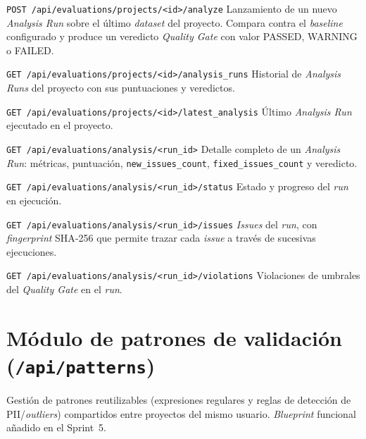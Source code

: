 \begin{definitionlist}
  \item[\texttt{POST /api/evaluations/projects/<id>/analyze}]  Lanzamiento
    de un nuevo \emph{Analysis Run} sobre el último \emph{dataset} del
    proyecto.  Compara contra el \emph{baseline} configurado y produce un
    veredicto \emph{Quality Gate} con valor PASSED, WARNING o FAILED.

  \item[\texttt{GET /api/evaluations/projects/<id>/analysis\_runs}]
    Historial de \emph{Analysis Runs} del proyecto con sus puntuaciones y
    veredictos.

  \item[\texttt{GET /api/evaluations/projects/<id>/latest\_analysis}]
    Último \emph{Analysis Run} ejecutado en el proyecto.

  \item[\texttt{GET /api/evaluations/analysis/<run\_id>}]  Detalle
    completo de un \emph{Analysis Run}: métricas, puntuación,
    \texttt{new\_issues\_count}, \texttt{fixed\_issues\_count} y veredicto.

  \item[\texttt{GET /api/evaluations/analysis/<run\_id>/status}]  Estado
    y progreso del \emph{run} en ejecución.

  \item[\texttt{GET /api/evaluations/analysis/<run\_id>/issues}]
    \emph{Issues} del \emph{run}, con \emph{fingerprint} \ac{SHA}-256 que
    permite trazar cada \emph{issue} a través de sucesivas ejecuciones.

  \item[\texttt{GET /api/evaluations/analysis/<run\_id>/violations}]
    Violaciones de umbrales del \emph{Quality Gate} en el \emph{run}.
\end{definitionlist}


\section{Módulo de patrones de validación (\texttt{/api/patterns})}
\label{sec:api-patterns}

Gestión de patrones reutilizables (expresiones regulares y reglas de
detección de \ac{PII}/\emph{outliers}) compartidos entre proyectos del
mismo usuario.  \emph{Blueprint} funcional añadido en el Sprint~5.


